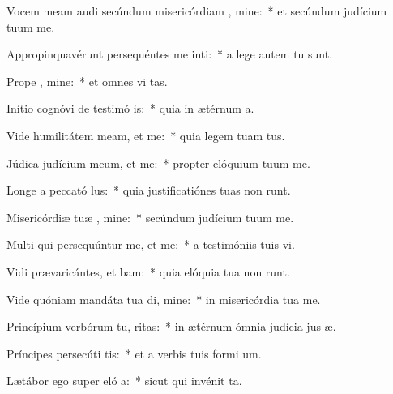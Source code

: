 \item Vocem meam audi secúndum misericórdiam , mine:~* et secúndum judícium tuum  me.
\item Appropinquavérunt persequéntes me inti:~* a lege autem tu   sunt.
\item Prope  , mine:~* et omnes vi  tas.
\item Inítio cognóvi de testimó is:~* quia in ætérnum  a.
\item Vide humilitátem meam, et  me:~* quia legem tuam   tus.
\item Júdica judícium meum, et  me:~* propter elóquium tuum  me.
\item Longe a peccató lus:~* quia justificatiónes tuas non runt.
\item Misericórdiæ tuæ , mine:~* secúndum judícium tuum  me.
\item Multi qui persequúntur me, et  me:~* a testimóniis tuis  vi.
\item Vidi prævaricántes, et bam:~* quia elóquia tua non runt.
\item Vide quóniam mandáta tua di, mine:~* in misericórdia tua  me.
\item Princípium verbórum tu, ritas:~* in ætérnum ómnia judícia jus æ.
\item Príncipes persecúti   tis:~* et a verbis tuis formi  um.
\item Lætábor ego super eló a:~* sicut qui invénit  ta.
